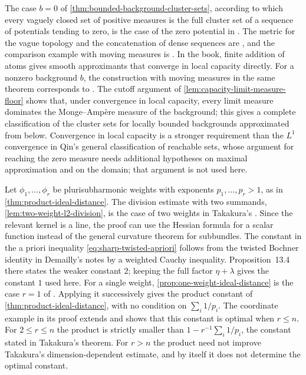 The case $b=0$ of \cref{thm:bounded-background-cluster-sets}, according to which every vaguely closed set of positive measures is the full cluster set of a sequence of potentials tending to zero, is the case of the zero potential in \cite[v1, Theorem~A, pp.~2--3]{QinLimits26}. The metric for the vague topology and the concatenation of dense sequences are \cite[v1, Lemma~3.3, p.~12 and Lemma~4.1, p.~14]{QinLimits26}, and the comparison example with moving measures is \cite[v1, Example~B.1, p.~28]{QinLimits26}. In the book, finite addition of atoms gives smooth approximants that converge in local capacity directly. For a nonzero background $b$, the construction with moving measures in the same theorem corresponds to \cite[v1, Theorem~3.4, pp.~13--14]{QinLimits26}. The cutoff argument of \cref{lem:capacity-limit-measure-floor} shows that, under convergence in local capacity, every limit measure dominates the Monge--Amp\`ere measure of the background; this gives a complete classification of the cluster sets for locally bounded backgrounds approximated from below. Convergence in local capacity is a stronger requirement than the $L^1$ convergence in Qin's general classification of reachable sets, whose argument for reaching the zero measure needs additional hypotheses on maximal approximation and on the domain; that argument is not used here.

Let $\phi_1,\ldots,\phi_r$ be plurisubharmonic weights with exponents $p_1,\ldots,p_r>1$, as in \cref{thm:product-ideal-distance}. The division estimate with two summands, \cref{lem:two-weight-l2-division}, is the case of two weights in Takakura's \cite[v1, Theorem~1.3, pp.~2 and 5--6]{TakDivision26}. Since the relevant kernel is a line, the proof can use the Hessian formula for a scalar function instead of the general curvature theorem for subbundles. The constant in the a priori inequality \eqref{eq:sharp-twisted-apriori} follows from the twisted Bochner identity in Demailly's notes \cite[Section~13.A, pp.~123--124]{DemAM11} by a weighted Cauchy inequality. Proposition~13.4 there states the weaker constant $2$; keeping the full factor $\eta+\lambda$ gives the constant $1$ used here. For a single weight, \cref{prop:one-weight-ideal-distance} is the case $r=1$ of \cite[v1, Theorem~1.2, pp.~1--2 and 6--7]{TakDivision26}. Applying it successively gives the product constant of \cref{thm:product-ideal-distance}, with no condition on $\sum_i1/p_i$. The coordinate example in its proof extends \cite[v1, Example~3.2, p.~7]{TakDivision26} and shows that this constant is optimal when $r\leq n$. For $2\leq r\leq n$ the product is strictly smaller than $1-r^{-1}\sum_i1/p_i$, the constant stated in Takakura's theorem. For $r>n$ the product need not improve Takakura's dimension-dependent estimate, and by itself it does not determine the optimal constant.


